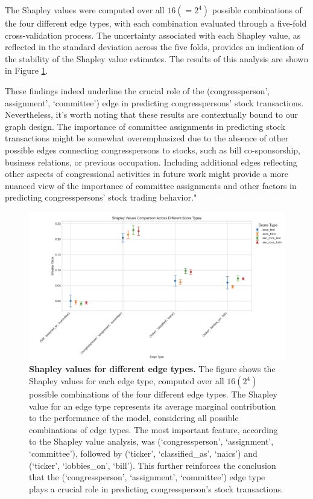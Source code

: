 \documentclass[15pt,letterpaper]{article}
\begin{document}
The Shapley values were computed over all $16 (=2^4)$ possible combinations of the four different edge types, with each combination evaluated through a five-fold cross-validation process. The uncertainty associated with each Shapley value, as reflected in the standard deviation across the five folds, provides an indication of the stability of the Shapley value estimates. The results of this analysis are shown in Figure \ref{fig:shap_values}.

These findings indeed underline the crucial role of the (congressperson', assignment', `committee') edge in predicting congresspersons' stock transactions. Nevertheless, it's worth noting that these results are contextually bound to our graph design. The importance of committee assignments in predicting stock transactions might be somewhat overemphasized due to the absence of other possible edges connecting congresspersons to stocks, such as bill co-sponsorship, business relations, or previous occupation. Including additional edges reflecting other aspects of congressional activities in future work might provide a more nuanced view of the importance of committee assignments and other factors in predicting congresspersons' stock trading behavior."

\begin{figure}[h!]
  \centering
  \includegraphics[width=1.1\textwidth, height=0.4\textheight]{imgs/shapeee.png}
  \caption{\textbf{Shapley values for different edge types.} The figure shows the Shapley values for each edge type, computed over all $16 (2^4)$ possible combinations of the four different edge types. The Shapley value for an edge type represents its average marginal contribution to the performance of the model, considering all possible combinations of edge types. The most important feature, according to the Shapley value analysis, was (`congressperson', `assignment', `committee'), followed by (`ticker', `classified\_as', `naics') and (`ticker', `lobbies\_on', `bill'). This further reinforces the conclusion that the (`congressperson', `assignment', `committee') edge type plays a crucial role in predicting congressperson's stock transactions.}
  \label{fig:shap_values}
\end{figure}
\end{document}
